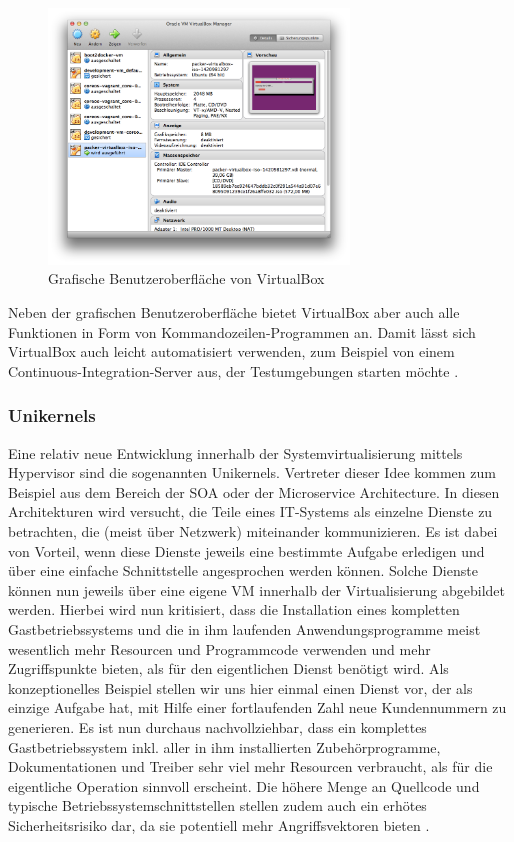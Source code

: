 \begin{figure}[!ht]
  \begin{center}
    \includegraphics[width=8cm]{bilder/virtualbox-gui.png}
    \caption{Grafische Benutzeroberfläche von VirtualBox}
  \end{center}
\end{figure}

Neben der grafischen Benutzeroberfläche bietet VirtualBox aber auch alle Funktionen in Form von Kommandozeilen-Programmen an. Damit lässt sich VirtualBox auch leicht automatisiert verwenden, zum Beispiel von einem Continuous-Integration-Server aus, der Testumgebungen starten möchte \citep[Vgl.][S. 113]{Oracle14}.

\subsubsection{Unikernels}

Eine relativ neue Entwicklung innerhalb der Systemvirtualisierung mittels Hypervisor sind die sogenannten Unikernels. Vertreter dieser Idee kommen zum Beispiel aus dem Bereich der \ac{SOA} oder der Microservice Architecture. In diesen Architekturen wird versucht, die Teile eines IT-Systems als einzelne Dienste zu betrachten, die (meist über Netzwerk) miteinander kommunizieren. Es ist dabei von Vorteil, wenn diese Dienste jeweils eine bestimmte Aufgabe erledigen und über eine einfache Schnittstelle angesprochen werden können. Solche Dienste können nun jeweils über eine eigene \ac{VM} innerhalb der Virtualisierung abgebildet werden. Hierbei wird nun kritisiert, dass die Installation eines kompletten Gastbetriebssystems und die in ihm laufenden Anwendungsprogramme meist wesentlich mehr Resourcen und Programmcode verwenden und mehr Zugriffspunkte bieten, als für den eigentlichen Dienst benötigt wird. Als konzeptionelles Beispiel stellen wir uns hier einmal einen Dienst vor, der als einzige Aufgabe hat, mit Hilfe einer fortlaufenden Zahl neue Kundennummern zu generieren. Es ist nun durchaus nachvollziehbar, dass ein komplettes Gastbetriebssystem inkl. aller in ihm installierten Zubehörprogramme, Dokumentationen und Treiber sehr viel mehr Resourcen verbraucht, als für die eigentliche Operation sinnvoll erscheint. Die höhere Menge an Quellcode und typische Betriebssystemschnittstellen stellen zudem auch ein erhötes Sicherheitsrisiko dar, da sie potentiell mehr Angriffsvektoren bieten \citep[Vgl.][Abstract und Introduction]{MadMorAnd13}.


